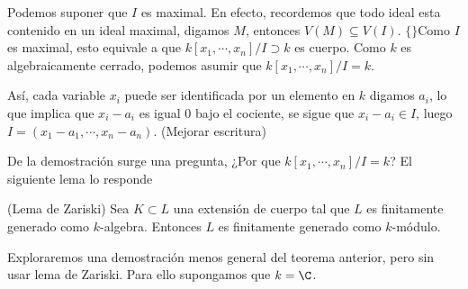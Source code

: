\documentclass{article}
\begin{document}
\begin{dem}
    Podemos suponer que $I$ es maximal. En efecto, recordemos que todo ideal esta contenido en un
    ideal maximal, digamos $M$, entonces $V(M)\subseteq V(I)$. $\{\}$Como $I$ es maximal, esto equivale
    a que $k[x_{1},\cdots,x_{n}]/I\supset k$ es cuerpo. Como $k$ es algebraicamente cerrado,
    podemos asumir que $k[x_{1},\cdots,x_{n}]/I=k$.
    \vspace{4mm}

    \noindent Así, cada variable $x_{i}$ puede ser identificada por un elemento en $k$ digamos
    $a_{i}$, lo que implica que $x_{i}-a_{i}$ es igual $0$ bajo el cociente, se sigue que 
    $x_{i}-a_{i}\in I$, luego $I=(x_{1}-a_{1},\cdots,x_{n}-a_{n})$. (Mejorar escritura)
\end{dem}

\noindent De la demostración surge una pregunta, ¿Por que $k[x_{1},\cdots,x_{n}]/I=k$? El siguiente 
lema lo responde

\begin{lema}
    (Lema de Zariski) Sea $K\subset L$ una extensión de cuerpo tal que $L$ es finitamente generado 
    como $k$-algebra. Entonces $L$ es finitamente generado como $k$-módulo.
\end{lema}

\noindent Exploraremos una demostración menos general del teorema anterior, pero sin usar lema de
Zariski. Para ello supongamos que $k=\C$.
\end{document}
